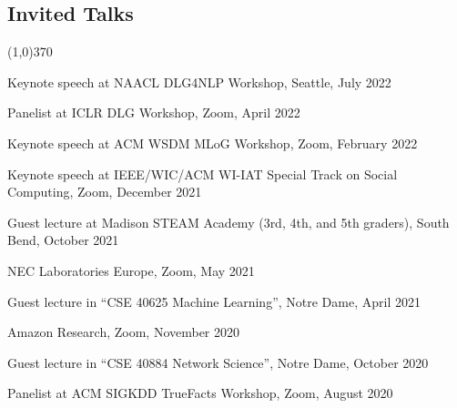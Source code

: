 \documentclass[10pt]{article}
\newenvironment{myindentpar}[1]%
{\begin{list}{}%
         {\setlength{\leftmargin}{#1}}%
         \item[]%
}
{\end{list}}
\newcounter{list}
\begin{document}




\subsection{\sc Invited Talks}
\vspace{-0.4cm} \line(1,0){370} \vspace{-0.1cm}

\begin{myindentpar}{0.75cm}

\hspace{-0.75cm} Keynote speech at NAACL DLG4NLP Workshop, Seattle, July 2022
	
\hspace{-0.75cm} Panelist at ICLR DLG Workshop, Zoom, April 2022
	
\hspace{-0.75cm} Keynote speech at ACM WSDM MLoG Workshop, Zoom, February 2022
	
\hspace{-0.75cm} Keynote speech at IEEE/WIC/ACM WI-IAT Special Track on Social Computing, Zoom, December 2021

	
\hspace{-0.75cm} Guest lecture at Madison STEAM Academy (3rd, 4th, and 5th graders), South Bend, October 2021
	
\hspace{-0.75cm} NEC Laboratories Europe, Zoom, May 2021
	
\hspace{-0.75cm} Guest lecture in ``CSE 40625 Machine Learning'', Notre Dame, April 2021
	
\hspace{-0.75cm} Amazon Research, Zoom, November 2020

\hspace{-0.75cm} Guest lecture in ``CSE 40884 Network Science'', Notre Dame, October 2020

\hspace{-0.75cm} Panelist at ACM SIGKDD TrueFacts Workshop, Zoom, August 2020
	

\end{myindentpar}
\end{document}

